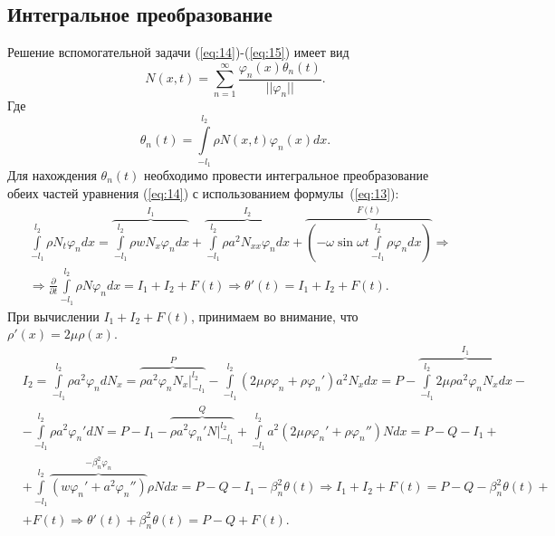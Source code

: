 \documentclass[12pt, a4paper]{article}
\begin{document}
\subsection{Интегральное преобразование}
Решение вспомогательной задачи (\ref{eq:14})-(\ref{eq:15}) имеет вид 
\begin{equation}
  N(x,t)=\sum \limits_{n=1}^{\infty} \frac{\varphi_n(x) \theta_n(t)}{||\varphi_n||}.
\end{equation}
Где
\begin{equation}
  \theta_n(t) = \int \limits_{-l_1}^{l_2} \rho N(x,t) \varphi_n(x) dx.
  \label{eq:13}
\end{equation}
Для нахождения $\theta_n(t)$ необходимо провести интегральное преобразование обеих частей уравнения (\ref{eq:14}) с использованием формулы~(\ref{eq:13}):
\begin{equation}
  \begin{aligned}
    & \int \limits_{-l_1}^{l_2} \rho N_t \varphi_n dx = \overbrace{\int \limits_{-l_1}^{l_2} \rho w N_x \varphi_n dx}^{I_1} + \overbrace{\int \limits_{-l_1}^{l_2} \rho a^2 N_{xx} \varphi_n dx}^{I_2} +  \overbrace{\left( -\omega \sin \omega t \int \limits_{-l_1}^{l_2} \rho \varphi_n dx \right)}^{F(t)}  \Rightarrow \\
  & \Rightarrow \frac{\partial}{\partial t} \int \limits_{-l_1}^{l_2} \rho N \varphi_n dx = I_1 + I_2 + F(t) \Rightarrow \theta'(t) = I_1 + I_2 + F(t).
\end{aligned}
\end{equation}
При вычислении $I_1+I_2+F(t)$, принимаем во внимание, что $\rho'(x) = 2 \mu \rho(x)$.
\begin{equation}
  \begin{aligned}
    & I_2 = \int \limits_{-l_1}^{l_2} \rho a^2 \varphi_n d N_x = \overbrace{\rho a^2 \varphi_n N_x \Big|^{l_2}_{-l_1}}^P - 
    \int \limits_{-l_1}^{l_2} (2\mu\rho\varphi_n + \rho\varphi_n') a^2 N_x dx = P - \overbrace{\int \limits_{-l_1}^{l_2} 2 \mu \rho a^2 \varphi_n N_x dx}^{I_1} - \\
    & - \int \limits_{-l_1}^{l_2} \rho a^2\varphi_n'd N = P - I_1 - \overbrace{\rho a^2 \varphi_n' N \Big|^{l_2}_{-l_1}}^Q + 
    \int \limits_{-l_1}^{l_2} a^2 (2\mu\rho\varphi_n' + \rho\varphi_n'') N dx = P - Q - I_1 + \\
    & + \int \limits_{-l_1}^{l_2} \overbrace{(w\varphi_n' + a^2\varphi_n'')}^{-\beta_n^2\varphi_n} \rho N dx = P - Q - I_1 - \beta_n^2 \theta(t) \Rightarrow I_1 + I_2 + F(t) = P - Q - 
    \beta_n^2 \theta(t) + \\
    & + F(t) \Rightarrow \theta'(t) + \beta_n^2 \theta(t) = P - Q + F(t).
  \end{aligned}
  \label{eq:17}
\end{equation}
\end{document}
